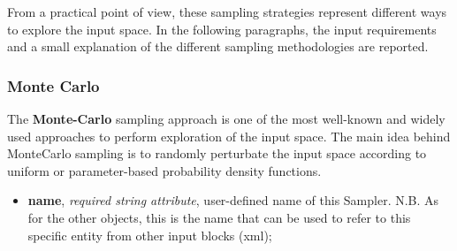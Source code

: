 From a practical point of view, these sampling strategies represent different
ways to explore the input space.
%
In the following paragraphs, the input requirements and a small explanation of
the different sampling methodologies are reported.


\subsubsection{Monte Carlo}
\label{subsubsubsec:MC}
The \textbf{Monte-Carlo} sampling approach is one of the most well-known and
widely used approaches to perform exploration of the input space.
%
The main idea behind MonteCarlo sampling is to  randomly perturbate the input space according
to uniform or parameter-based probability density functions.
%

%
\attrsIntro
\vspace{-5mm}
\begin{itemize}
\itemsep0em
\item \textbf{name}, \textit{required string attribute}, user-defined name of this Sampler. N.B. As for the other objects, this is the name that can be used to refer to this specific entity from other input blocks (xml);
\end{itemize}
\vspace{-5mm}

